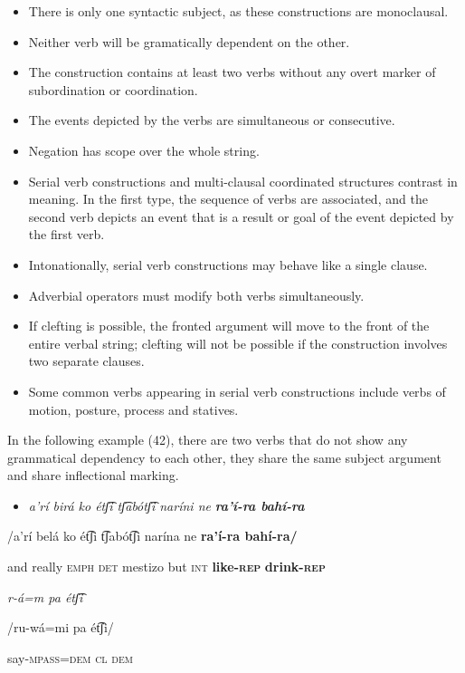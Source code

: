 \begin{itemize}
\item There is only one syntactic subject, as these constructions are monoclausal.
\item Neither verb will be gramatically dependent on the other.
\item The construction contains at least two verbs without any overt marker of subordination or coordination.
\item The events depicted by the verbs are simultaneous or consecutive.
\item Negation has scope over the whole string.
\item Serial verb constructions and multi-clausal coordinated structures contrast in meaning. In the first type, the sequence of verbs are associated, and the second verb depicts an event that is a result or goal of the event depicted by the first verb. 
\item Intonationally, serial verb constructions may behave like a single clause. 
\item Adverbial operators must modify both verbs simultaneously.  
\item If clefting is possible, the fronted argument will move to the front of the entire verbal string; clefting will not be possible if the construction involves two separate clauses.
\item Some common verbs appearing in serial verb constructions include verbs of motion, posture, process and statives.  
\end{itemize}

In the following example (42), there are two verbs that do not show any grammatical dependency to each other, they share the same subject argument and share inflectional marking.

\begin{itemize}
\item \textit{a’rí   birá   ko   étʃ͡i   tʃ͡abótʃ͡i     naríni  ne} \textbf{\textit{ra'í-ra     bahí-ra}}   
\end{itemize}

/a’rí  belá  ko  ét͡ʃi  t͡ʃabót͡ʃi  narína  ne  \textbf{ra’í-ra    bahí-ra/}

    and  really  \textsc{emph  det}  mestizo  but  \textsc{int}  \textbf{like-\textsc{rep}} \textbf{drink-\textsc{rep}} 

    \textit{r-á=m       pa   étʃ͡i}

 /ru-wá=mi    pa  ét͡ʃi/

 say-\textsc{mpass=dem  cl  dem}

